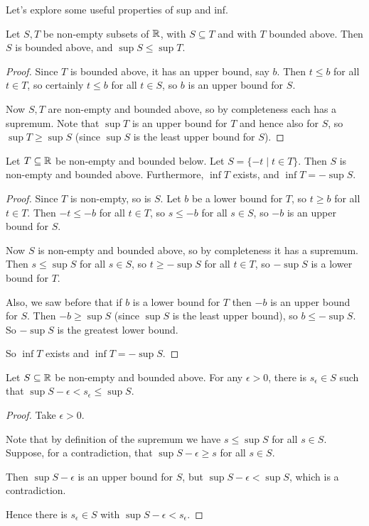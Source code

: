 Let's explore some useful properties of sup and inf.

\begin{proposition}
Let $S, T$ be non-empty subsets of $\mathbb R$, with $S \subseteq T$ and with $T$ bounded above. Then $S$ is bounded above, and $\sup S \le \sup T$.
\end{proposition}
\begin{proof}
Since $T$ is bounded above, it has an upper bound, say $b$. Then $t \le b$ for all $t \in T$, so certainly $t \le b$ for all $t \in S$, so $b$ is an upper bound for $S$.

Now $S, T$ are non-empty and bounded above, so by completeness each has a supremum. Note that $\sup T$ is an upper bound for $T$ and hence also for $S$, so $\sup T \ge \sup S$ (since $\sup S$ is the least upper bound for $S$).
\end{proof}

\begin{proposition}
Let $T \subseteq \mathbb R$ be non-empty and bounded below. Let $S = \{-t \mid t \in T\}$. Then $S$ is non-empty and bounded above. Furthermore, $\inf T$ exists, and $\inf T = -\sup S$.
\end{proposition}
\begin{proof}
Since $T$ is non-empty, so is $S$. Let $b$ be a lower bound for $T$, so $t \ge b$ for all $t \in T$. Then $-t \le -b$ for all $t \in T$, so $s \le -b$ for all $s \in S$, so $-b$ is an upper
bound for $S$.

Now $S$ is non-empty and bounded above, so by completeness it has a
supremum. Then $s \le \sup S$ for all $s \in S$, so $t \ge -\sup S$ for all $t \in T$, so $-\sup S$ is a lower bound for $T$.

Also, we saw before that if $b$ is a lower bound for $T$ then $-b$ is an upper bound for $S$. Then $-b \ge \sup S$ (since $\sup S$ is the least upper bound), so $b \le -\sup S$. So $-\sup S$ is the greatest lower bound.

So $\inf T$ exists and $\inf T = -\sup S$.
\end{proof}

\begin{proposition}
Let $S \subseteq \mathbb R$ be non-empty and bounded above. For any $\epsilon > 0$, there is $s_\epsilon \in S$ such that $\sup S-\epsilon < s_\epsilon \le \sup S$.
\end{proposition}
\begin{proof}
Take $\epsilon > 0$.

Note that by definition of the supremum we have $s \le \sup S$ for all $s \in S$. Suppose, for a contradiction, that $\sup S-\epsilon \ge s$ for all $s \in S$.

Then $\sup S-\epsilon$ is an upper bound for $S$, but $\sup S-\epsilon < \sup S$, which is a contradiction.

Hence there is $s_\epsilon \in S$ with $\sup S-\epsilon<s_\epsilon$.
\end{proof}
\pagebreak

